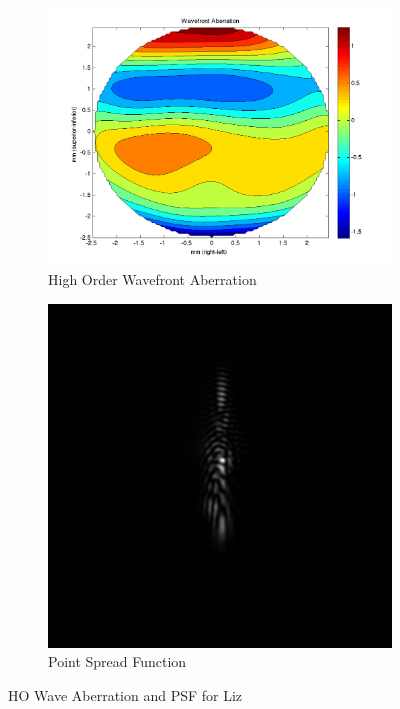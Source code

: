 \documentclass{article}
\begin{document}
\clearpage

\begin{figure}[H]
\begin{subfigure}{.5\textwidth}
  \centering
  \includegraphics[width=1\linewidth]{Liz_WFA.png}
  \caption{High Order Wavefront Aberration}
  \label{fig:lizhowa}
\end{subfigure}%
\begin{subfigure}{.5\textwidth}
  \centering
  \includegraphics[width=.8\linewidth]{Liz_PSF.png}
  \caption{Point Spread Function}
  \label{fig:lizpsf}
\end{subfigure}
\caption{HO Wave Aberration and PSF for Liz}
\label{fig:liz}
\end{figure}
\end{document}
